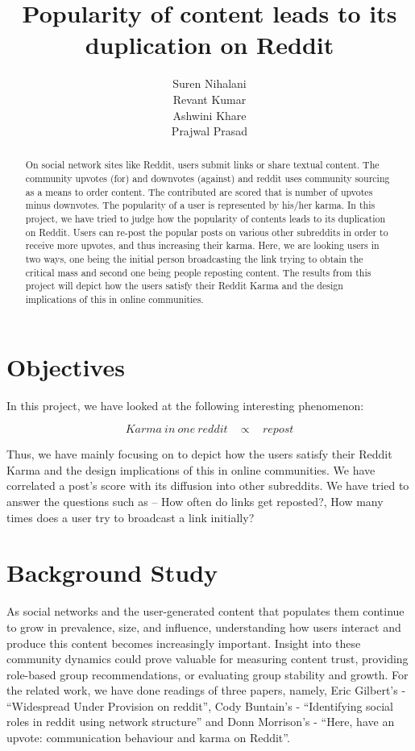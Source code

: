 \documentclass{article} %
\title{Popularity of content leads to its duplication on Reddit}
\author{
Suren Nihalani \\
\And
Revant Kumar \\
\And
Ashwini Khare \\
\And
Prajwal Prasad
}
\begin{document}
\maketitle

\begin{abstract}
On social network sites like Reddit, users submit links or share textual content. The community upvotes (for) and downvotes (against) and reddit uses community sourcing as a means to order content. The contributed are scored that is number of upvotes minus downvotes. The popularity of a user is represented by his/her karma. In this project, we have tried to judge how the popularity of contents leads to its duplication on Reddit. Users can re-post the popular posts on various other subreddits in order to receive more upvotes, and thus increasing their karma. Here, we are looking users in two ways, one being the initial person broadcasting the link trying to obtain the critical mass and second one being people reposting content. The results from this project will depict how the users satisfy their Reddit Karma and the design implications of this in online communities. 
\end{abstract}

\section{Objectives}
In this project, we have looked at the following interesting phenomenon:

\begin{equation} 
Karma\ in\ one\ reddit\ \ \ \ \propto\ \ \ \ repost  \nonumber
\end{equation}

Thus, we have mainly focusing on to depict how the users satisfy their Reddit Karma and the design implications of this in online communities. We have correlated a post's score with its diffusion into other subreddits. We have tried to answer the questions such as -- How often do links get reposted?, How many times does a user try to broadcast a link initially? 


\section{Background Study}

As social networks and the user-generated content that populates them continue to grow in prevalence, size, and influence, understanding how users interact and produce this content becomes increasingly important. Insight into these community dynamics could prove valuable for measuring content trust, providing role-based group recommendations, or evaluating group stability and growth. For the related work, we have done readings of three papers, namely, Eric Gilbert's - ``Widespread Under Provision on reddit'', Cody Buntain's - ``Identifying social roles in reddit using network structure'' and Donn Morrison's - ``Here, have an upvote: communication behaviour and karma on Reddit''.
\end{document}
